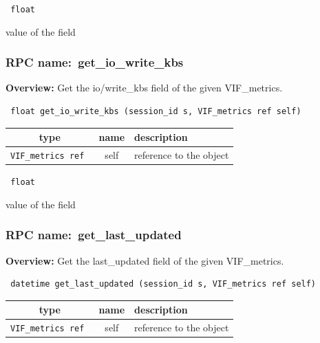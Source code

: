 \vspace{0.3cm}

{\tt 
float
}


value of the field
\vspace{0.3cm}
\vspace{0.3cm}
\vspace{0.3cm}
\subsubsection{RPC name:~get\_io\_write\_kbs}

{\bf Overview:} 
Get the io/write\_kbs field of the given VIF\_metrics.

\begin{verbatim} float get_io_write_kbs (session_id s, VIF_metrics ref self)\end{verbatim}



 
\vspace{0.3cm}
\begin{tabular}{|c|c|p{7cm}|}
 \hline
{\bf type} & {\bf name} & {\bf description} \\ \hline
{\tt VIF\_metrics ref } & self & reference to the object \\ \hline 

\end{tabular}

\vspace{0.3cm}

{\tt 
float
}


value of the field
\vspace{0.3cm}
\vspace{0.3cm}
\vspace{0.3cm}
\subsubsection{RPC name:~get\_last\_updated}

{\bf Overview:} 
Get the last\_updated field of the given VIF\_metrics.

\begin{verbatim} datetime get_last_updated (session_id s, VIF_metrics ref self)\end{verbatim}



 
\vspace{0.3cm}
\begin{tabular}{|c|c|p{7cm}|}
 \hline
{\bf type} & {\bf name} & {\bf description} \\ \hline
{\tt VIF\_metrics ref } & self & reference to the object \\ \hline 

\end{tabular}

